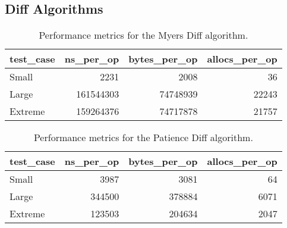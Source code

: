\newpage

\subsection{Diff Algorithms}

\begin{table}[h]
    \centering
    \begin{tabular}{|l|r|r|r|}
        \hline
        \multicolumn{1}{|c|}{\textbf{test\_case}} & \multicolumn{1}{c|}{\textbf{ns\_per\_op}} & \multicolumn{1}{c|}{\textbf{bytes\_per\_op}} & \multicolumn{1}{c|}{\textbf{allocs\_per\_op}} \\ \hline
        Small                                     & 2231                                      & 2008                                         & 36                                            \\ \hline
        Large                                     & 161544303                                 & 74748939                                     & 22243                                         \\ \hline
        Extreme                                   & 159264376                                 & 74717878                                     & 21757                                         \\ \hline
    \end{tabular}
    \caption{Performance metrics for the Myers Diff algorithm.}
    \label{tab:myers-diff-benchmark-results}
\end{table}
\begin{table}[h]
    \centering
    \begin{tabular}{|l|r|r|r|}
        \hline
        \multicolumn{1}{|c|}{\textbf{test\_case}} & \multicolumn{1}{c|}{\textbf{ns\_per\_op}} & \multicolumn{1}{c|}{\textbf{bytes\_per\_op}} & \multicolumn{1}{c|}{\textbf{allocs\_per\_op}} \\ \hline
        Small                                     & 3987                                      & 3081                                         & 64                                            \\ \hline
        Large                                     & 344500                                    & 378884                                       & 6071                                          \\ \hline
        Extreme                                   & 123503                                    & 204634                                       & 2047                                          \\ \hline
    \end{tabular}
    \caption{Performance metrics for the Patience Diff algorithm.}
    \label{tab:patience-diff-benchmark-results}
\end{table}

